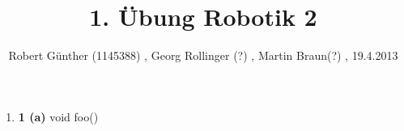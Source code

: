 \documentclass[10pt,a4paper]{article} [2003/01/01]
\title{1. Übung Robotik 2}
\author{ Robert Günther (1145388) , Georg Rollinger (?) , Martin Braun(?) , 19.4.2013}
\date{}
\begin{document}
\maketitle
\begin{enumerate}

\item[]{\textbf{1 (a)}
   void foo()
}



\end{enumerate}
\end{document}
